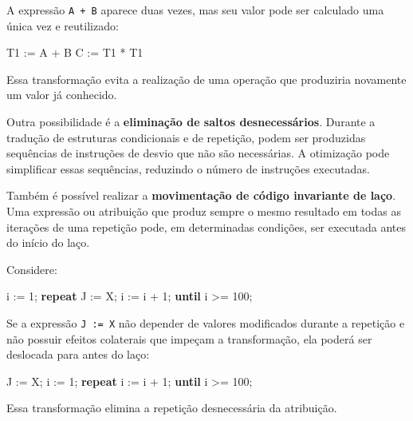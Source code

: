 \documentclass[
  brazilian,
  letterpaper,
]{book}
\newenvironment{Shaded}{\begin{snugshade}}{\end{snugshade}}
\newcommand{\DecValTok}[1]{\textcolor[rgb]{0.68,0.00,0.00}{#1}}
\newcommand{\KeywordTok}[1]{\textcolor[rgb]{0.00,0.23,0.31}{\textbf{#1}}}
\newcommand{\NormalTok}[1]{\textcolor[rgb]{0.00,0.23,0.31}{#1}}
\theoremstyle{plain}
\theoremstyle{definition}
\theoremstyle{remark}
\begin{document}
A expressão \texttt{A\ +\ B} aparece duas vezes, mas seu valor pode ser
calculado uma única vez e reutilizado:

\begin{Shaded}
\begin{Highlighting}[]
\NormalTok{T1 := A + B}
\NormalTok{C := T1 * T1}
\end{Highlighting}
\end{Shaded}

Essa transformação evita a realização de uma operação que produziria
novamente um valor já conhecido.

Outra possibilidade é a \textbf{eliminação de saltos desnecessários}.
Durante a tradução de estruturas condicionais e de repetição, podem ser
produzidas sequências de instruções de desvio que não são necessárias. A
otimização pode simplificar essas sequências, reduzindo o número de
instruções executadas.

Também é possível realizar a \textbf{movimentação de código invariante
de laço}. Uma expressão ou atribuição que produz sempre o mesmo
resultado em todas as iterações de uma repetição pode, em determinadas
condições, ser executada antes do início do laço.

Considere:

\begin{Shaded}
\begin{Highlighting}[]
\NormalTok{i := }\DecValTok{1}\NormalTok{;}
\KeywordTok{repeat}
\NormalTok{    J := X;}
\NormalTok{    i := i + }\DecValTok{1}\NormalTok{;}
\KeywordTok{until}\NormalTok{ i \textgreater{}= }\DecValTok{100}\NormalTok{;}
\end{Highlighting}
\end{Shaded}

Se a expressão \texttt{J\ :=\ X} não depender de valores modificados
durante a repetição e não possuir efeitos colaterais que impeçam a
transformação, ela poderá ser deslocada para antes do laço:

\begin{Shaded}
\begin{Highlighting}[]
\NormalTok{J := X;}
\NormalTok{i := }\DecValTok{1}\NormalTok{;}
\KeywordTok{repeat}
\NormalTok{    i := i + }\DecValTok{1}\NormalTok{;}
\KeywordTok{until}\NormalTok{ i \textgreater{}= }\DecValTok{100}\NormalTok{;}
\end{Highlighting}
\end{Shaded}

Essa transformação elimina a repetição desnecessária da atribuição.
\end{document}
